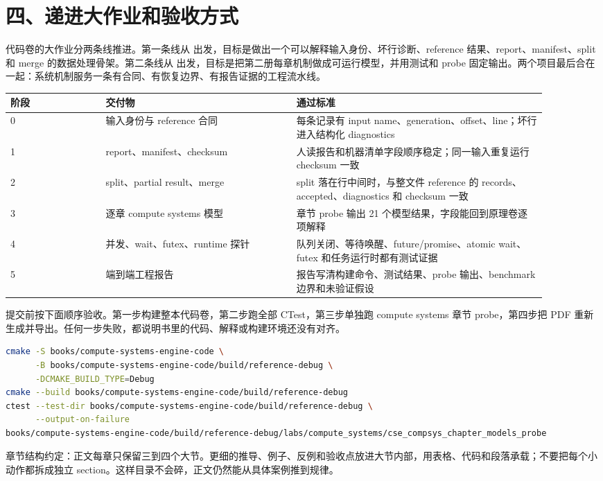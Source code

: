 \section{四、递进大作业和验收方式}

代码卷的大作业分两条线推进。第一条线从  出发，目标是做出一个可以解释输入身份、坏行诊断、reference 结果、report、manifest、split 和 merge 的数据处理骨架。第二条线从  出发，目标是把第二册每章机制做成可运行模型，并用测试和 probe 固定输出。两个项目最后合在一起：系统机制服务一条有合同、有恢复边界、有报告证据的工程流水线。

\begin{longtable}{p{0.16\linewidth}p{0.32\linewidth}p{0.42\linewidth}}
阶段 & 交付物 & 通过标准 \\
\hline
0 & 输入身份与 reference 合同 & 每条记录有 input name、generation、offset、line；坏行进入结构化 diagnostics \\
1 & report、manifest、checksum & 人读报告和机器清单字段顺序稳定；同一输入重复运行 checksum 一致 \\
2 & split、partial result、merge & split 落在行中间时，与整文件 reference 的 records、accepted、diagnostics 和 checksum 一致 \\
3 & 逐章 compute systems 模型 & 章节 probe 输出 21 个模型结果，字段能回到原理卷逐项解释 \\
4 & 并发、wait、futex、runtime 探针 & 队列关闭、等待唤醒、future/promise、atomic wait、futex 和任务运行时都有测试证据 \\
5 & 端到端工程报告 & 报告写清构建命令、测试结果、probe 输出、benchmark 边界和未验证假设 \\
\end{longtable}

提交前按下面顺序验收。第一步构建整本代码卷，第二步跑全部 CTest，第三步单独跑 compute systems 章节 probe，第四步把 PDF 重新生成并导出。任何一步失败，都说明书里的代码、解释或构建环境还没有对齐。

\begin{lstlisting}[language=bash,caption={提交前最小验收命令}]
cmake -S books/compute-systems-engine-code \
      -B books/compute-systems-engine-code/build/reference-debug \
      -DCMAKE_BUILD_TYPE=Debug
cmake --build books/compute-systems-engine-code/build/reference-debug
ctest --test-dir books/compute-systems-engine-code/build/reference-debug \
      --output-on-failure
books/compute-systems-engine-code/build/reference-debug/labs/compute_systems/cse_compsys_chapter_models_probe
\end{lstlisting}

\begin{labbox}
章节结构约定：正文每章只保留三到四个大节。更细的推导、例子、反例和验收点放进大节内部，用表格、代码和段落承载；不要把每个小动作都拆成独立 section。这样目录不会碎，正文仍然能从具体案例推到规律。
\end{labbox}
